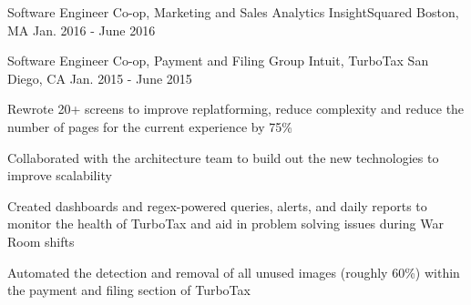 

\begin{cventries}


  \cventry
    {Software Engineer Co-op, Marketing and Sales Analytics} %
    {InsightSquared} %
    {Boston, MA} %
    {Jan. 2016 - June 2016} %
    {
      \begin{cvitems} %
        \item {}
        \item {}
        \item {}
      \end{cvitems}
    }

  \cventry
    {Software Engineer Co-op, Payment and Filing Group} %
    {Intuit, TurboTax} %
    {San Diego, CA} %
    {Jan. 2015 - June 2015} %
    {
      \begin{cvitems} %
        \item {Rewrote 20+ screens to improve replatforming, reduce complexity and reduce the number of pages for the current experience by 75\%}
        \item {Collaborated with the architecture team to build out the new technologies to improve scalability}
        \item {Created dashboards and regex-powered queries, alerts, and daily reports to monitor the health of TurboTax and aid in problem solving issues during War Room shifts}
        \item {Automated the detection and removal of all unused images (roughly 60\%) within the payment and filing section of TurboTax}
      \end{cvitems}
    }


\end{cventries}
